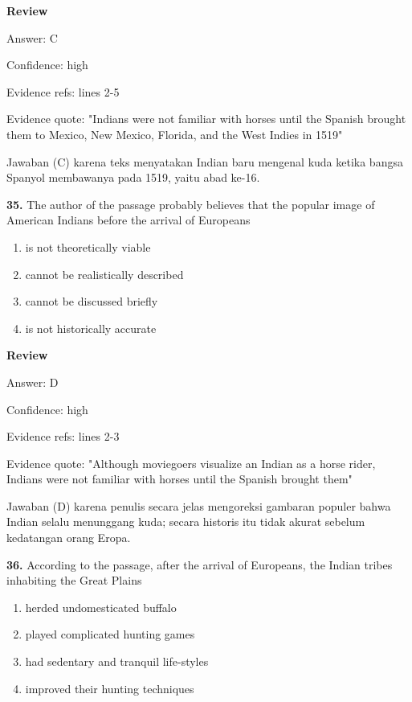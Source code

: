 \documentclass[12pt]{article}
\begin{document}
\par
\begingroup
\setlength{\parskip}{0pt}
\setlength{\parindent}{0pt}
\textbf{Review}\par
Answer: C\par
Confidence: high\par
Evidence refs: lines 2-5\par
Evidence quote: "Indians were not familiar with horses until the Spanish brought them to Mexico, New Mexico, Florida, and the West Indies in 1519"\par
Jawaban (C) karena teks menyatakan Indian baru mengenal kuda ketika bangsa Spanyol membawanya pada 1519, yaitu abad ke-16.\par
\endgroup
\par
\vspace{0.25\baselineskip}
\noindent\textbf{35.} The author of the passage probably believes that the popular image of American Indians before the arrival of Europeans
\begin{enumerate}[label=(\Alph*),leftmargin=*,itemsep=0.2em]
\item is not theoretically viable
\item cannot be realistically described
\item cannot be discussed briefly
\item is not historically accurate
\end{enumerate}
\par
\begingroup
\setlength{\parskip}{0pt}
\setlength{\parindent}{0pt}
\textbf{Review}\par
Answer: D\par
Confidence: high\par
Evidence refs: lines 2-3\par
Evidence quote: "Although moviegoers visualize an Indian as a horse rider, Indians were not familiar with horses until the Spanish brought them"\par
Jawaban (D) karena penulis secara jelas mengoreksi gambaran populer bahwa Indian selalu menunggang kuda; secara historis itu tidak akurat sebelum kedatangan orang Eropa.\par
\endgroup
\par
\vspace{0.25\baselineskip}
\noindent\textbf{36.} According to the passage, after the arrival of Europeans, the Indian tribes inhabiting the Great Plains
\begin{enumerate}[label=(\Alph*),leftmargin=*,itemsep=0.2em]
\item herded undomesticated buffalo
\item played complicated hunting games
\item had sedentary and tranquil life-styles
\item improved their hunting techniques
\end{enumerate}
\end{document}
